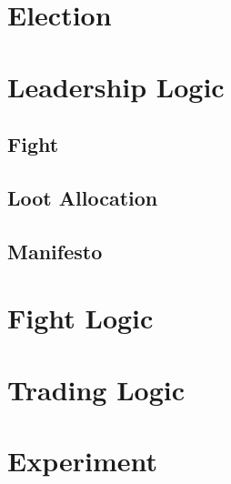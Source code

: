 \section{Election}



\section{Leadership Logic}
\subsection{Fight}
\subsection{Loot Allocation}
\subsection{Manifesto}



\section{Fight Logic}



\section{Trading Logic}



\section{Experiment}
